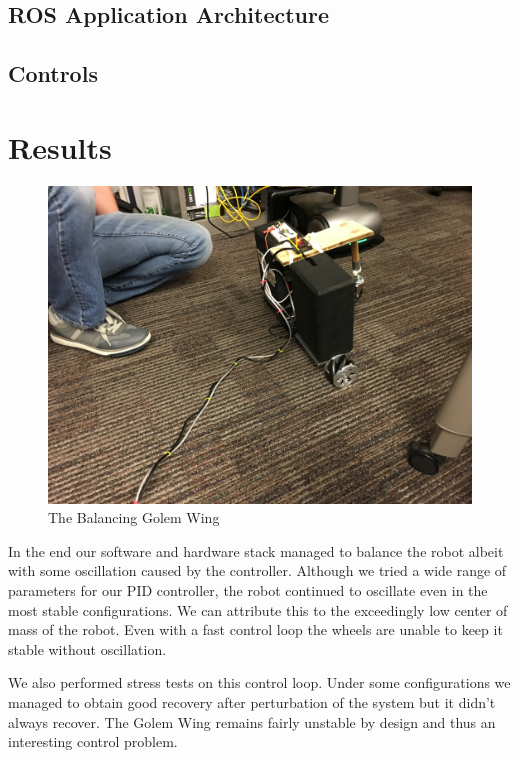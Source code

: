 \documentclass[12pt,conference,onecolumn,titlepage]{IEEEtran} %
\begin{document}
\subsection{ROS Application Architecture} %
\label{sec:ros-appl-arch}

\subsection{Controls} %
\label{sec:controls}


\section{Results}
\label{sec:results}
\begin{figure}
  \centering
  \includegraphics[width=\textwidth]{2016-05-05_04_21_25.jpg}
  \caption{The Balancing Golem Wing}
  \label{fig:balancing}
\end{figure}
In the end our software and hardware stack managed to balance the robot albeit with some oscillation caused by the controller. Although we tried a wide range of parameters for our PID controller, the robot continued to oscillate even in the most stable configurations. We can attribute this to the exceedingly low center of mass of the robot. Even with a fast control loop the wheels are unable to keep it stable without oscillation.\par
We also performed stress tests on this control loop. Under some configurations we managed to obtain good recovery after perturbation of the system but it didn't always recover. The Golem Wing remains fairly unstable by design and thus an interesting control problem.\par
\end{document}
